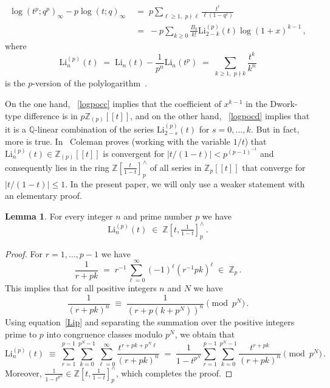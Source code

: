 \documentclass[12pt,reqno]{amsart}
\theoremstyle{definition}
\newtheorem{lemma}[proposition]{Lemma}
\def\BZ{\mathbb Z}
\def\BQ{\mathbb Q}
\def\Li{\mathrm{Li}}
\def\be{\begin{equation}}
\def\ee{\end{equation}}
\def\={\;=\;}
\def\inn{\;\in\;}
\def\cm{\;\equiv\;}
\begin{document}
\begin{align}
\label{logpocc}
\log(t^p;q^p)_\infty-p \log(t;q)_\infty & \=
p \sum_{\ell \geq 1, \,\, p\nmid\ell} \frac{t^\ell}{\ell(1-q^\ell)}
\\
\label{logpocd}
& \=
-p \sum_{k \geq 0} \frac{B_k}{k!} \Li_{2-k}^{(p)}(t) \log(1+x)^{k-1}\,,
\end{align}
where 
\be
\label{Lip}
\Li_n^{(p)}(t) \= \Li_n(t) - \frac{1}{p^n} \Li_n(t^p) \=
\sum_{k \geq 1, \,\, p\nmid k} \frac{t^k}{k^n} 
\ee
is the $p$-version of the polylogarithm~\cite[Prop.6.2]{Coleman}.

On the one hand, ~\eqref{logpocc} implies that the coefficient of $x^{k-1}$ in the
Dwork-type difference is in $p\BZ_{(p)}[\![t]\!]$, and on the other hand,
~\eqref{logpocd} implies that it is a $\BQ$-linear combination of the series
$\Li_{2-s}^{(p)}(t)$ for $s=0,\dots,k$. 
But in fact, more is true. In~\cite[Prop.6.2]{Coleman} Coleman proves (working with
the variable $1/t$) that $\Li_n^{(p)}(t) \in \BZ_{(p)}[\![t]\!]$ is convergent for
$|t/(1-t)|< p^{(p-1)^{-1}}$ and consequently lies in the ring
$\BZ[\tfrac{t}{1-t}]^\wedge_p$ of all series in
$\BZ_p[\![t]\!]$ that converge for $|t/(1-t)| \leq 1$. In the present paper, we will
only use a weaker statement with an elementary proof.

\begin{lemma}
\label{lem.lip}
For every integer $n$ and prime number $p$ we have
\be
\label{eq.LIP}
\Li_n^{(p)}(t) \inn \BZ[t,\tfrac{1}{1-t}]^\wedge_p \,.
\ee
\end{lemma}


\begin{proof}
For $r=1,\dots,p-1$ we have
\be
\frac{1}{r+pk} \=
r^{-1}\sum_{\ell=0}^{\infty}(-1)^\ell(r^{-1}pk)^{\ell}\inn\BZ_p\,.
\ee
This implies that for all positive integers $n$ and $N$ we have
\be
\frac{1}{(r+pk)^n} \cm \frac{1}{(r+p(k+p^N))^n} \pmod{p^N} \,.
\ee
Using equation~\eqref{Lip} and separating the summation over the
positive integers prime to $p$ into congruence classes modulo $p^N$, we obtain that
\be
\Li_n^{(p)}(t) \cm \sum_{r=1}^{p-1} \sum_{k=0}^{p^N-1}
\sum_{\ell=0}^{\infty} \frac{t^{r+pk+p^N\ell}}{(r+pk)^n}
\=
\frac{1}{1-t^{p^N}} \sum_{r=1}^{p-1} \sum_{k=0}^{p^N-1}
\frac{t^{r+pk}}{(r+pk)^n} \pmod{p^{N}}\,.
\ee
Moreover, $\frac{1}{1-t^{p^N}}\in\BZ[t,\tfrac{1}{1-t}]^\wedge_p$, which completes
the proof.
\end{proof}
\end{document}

